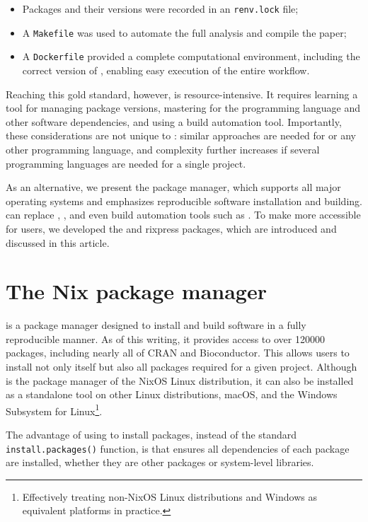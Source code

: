 \documentclass[
  article]{jss}
\providecommand{\tightlist}{%
  \setlength{\itemsep}{0pt}\setlength{\parskip}{0pt}}
\begin{document}
\begin{itemize}
\tightlist
\item
  Packages and their versions were recorded in an \texttt{renv.lock}
  file;
\item
  A \texttt{Makefile} was used to automate the full analysis and compile
  the paper;
\item
  A \texttt{Dockerfile} provided a complete computational environment,
  including the correct version of , enabling easy execution
  of the entire workflow.
\end{itemize}

Reaching this gold standard, however, is resource-intensive. It requires
learning a tool for managing package versions, mastering 
for the programming language and other software dependencies, and using
a build automation tool. Importantly, these considerations are not
unique to : similar approaches are needed for
 or any other programming language, and complexity
further increases if several programming languages are needed for a
single project.

As an alternative, we present the  package manager, which
supports all major operating systems and emphasizes reproducible
software installation and building.  can replace ,
, and even build automation tools such as . To make
 more accessible for  users, we developed the
 and {rixpress} packages, which are introduced and discussed in
this article.

\section{The Nix package manager}\label{sec-nix}

 is a package manager designed to install and build software in
a fully reproducible manner. As of this writing, it provides access to
over 120000 packages, including nearly all of CRAN and Bioconductor.
This allows users to install not only  itself but also all
packages required for a given project. Although  is the package
manager of the NixOS Linux distribution, it can also be installed as a
standalone tool on other Linux distributions, macOS, and the Windows
Subsystem for Linux\footnote{Effectively treating non-NixOS Linux
  distributions and Windows as equivalent platforms in practice.}.

The advantage of using  to install  packages,
instead of the standard \texttt{install.packages()} function, is that
 ensures all dependencies of each package are installed,
whether they are other  packages or system-level libraries.
\end{document}
